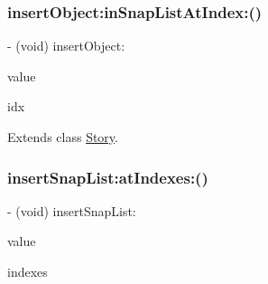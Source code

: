 \hypertarget{category_story_07_core_data_generated_accessors_08_ac7aaa8d738a55d8f7cb8fd0c26fd4b70}{}\label{category_story_07_core_data_generated_accessors_08_ac7aaa8d738a55d8f7cb8fd0c26fd4b70} 
\subsubsection{\texorpdfstring{insert\+Object\+:in\+Snap\+List\+At\+Index\+:()}{insertObject:inSnapListAtIndex:()}}
{\footnotesize\ttfamily -\/ (void) insert\+Object\+: \begin{DoxyParamCaption}\item[{(\hyperlink{interface_snap}{Snap} $\ast$)}]{value }\item[{inSnapListAtIndex:(N\+S\+U\+Integer)}]{idx }\end{DoxyParamCaption}}



Extends class \hyperlink{interface_story_ac7aaa8d738a55d8f7cb8fd0c26fd4b70}{Story}.

\hypertarget{category_story_07_core_data_generated_accessors_08_a84a4bc73fd231a323da10244fa876157}{}\label{category_story_07_core_data_generated_accessors_08_a84a4bc73fd231a323da10244fa876157} 
\subsubsection{\texorpdfstring{insert\+Snap\+List\+:at\+Indexes\+:()}{insertSnapList:atIndexes:()}}
{\footnotesize\ttfamily -\/ (void) insert\+Snap\+List\+: \begin{DoxyParamCaption}\item[{(N\+S\+Array$<$ \hyperlink{interface_snap}{Snap} $\ast$ $>$ $\ast$)}]{value }\item[{atIndexes:(N\+S\+Index\+Set $\ast$)}]{indexes }\end{DoxyParamCaption}}



